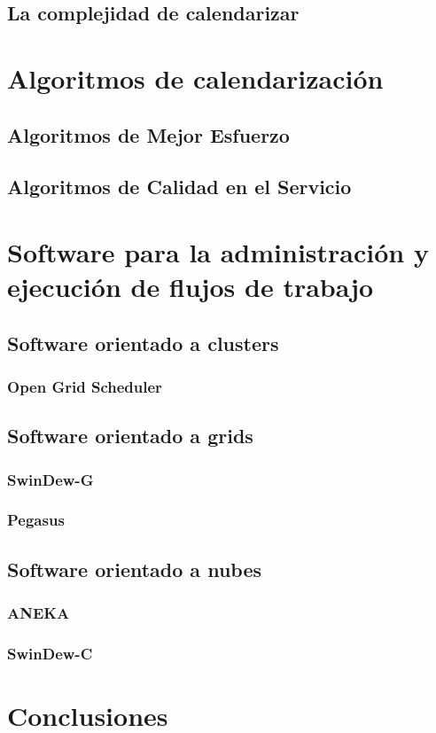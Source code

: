 \documentclass[letterpaper, 12pt]{report}
\begin{document}
\section{La complejidad de calendarizar}

\chapter{Algoritmos de calendarización}

\section{Algoritmos de Mejor Esfuerzo}

\section{Algoritmos de Calidad en el Servicio}

\chapter{Software para la administración y ejecución de flujos de trabajo}

\section{Software orientado a clusters}

\subsection{Open Grid Scheduler}

\section{Software orientado a grids}


\subsection{SwinDew-G}

\subsection{Pegasus}

\section{Software orientado a nubes}

\subsection{ANEKA}

\subsection{SwinDew-C}



\chapter{Conclusiones}



\end{document}
